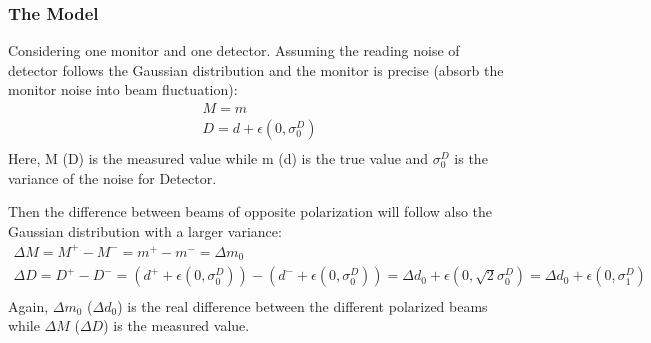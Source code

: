 \begin{comment}
For example, the famous least square fit is actually a linear regression 
$$ Y = c_0 + \sum c_i x_i + \epsilon $$
assuming Gaussian distribution of the dependent variable: $\epsilon \sim N(0, \sigma)$
Another frequenctly used scene is logistic regression for classification, which
is very similar to linear regression except f(X) will be converted into a
probability function, e.x. using the logistic function:
$$ h(z) = \frac{e^z}{1 + e^z} \quad z = f(X) $$

The assumpsion we made here is that the fluctuations in beam parameters in small, 
compared to their normal yield -- this can be verified by their yield plot. So
that we can use first order fit to model the detector's response to change in
beam parameters. Therefore the `true' asymmetry will be:
\begin{equation}
    \CA_{cor} = \CA_{raw} - \sum_i \beta_i\Delta M_i
\end{equation}
where $\CA_{cor}$ is the corrected asymmetry, $\beta_i = \frac{\partial \CA_{raw}}{\Delta M_i}$ 
is the slope and $\Delta M$ is the difference of BPM yield bewtween 
opposite helicities windows, i sums over all 5 chosen BPMs.
\end{comment}

\subsubsection{The Model}
Considering one monitor and one detector. Assuming the reading noise of detector
follows the Gaussian distribution and the monitor is precise (absorb the monitor
noise into beam fluctuation):
\begin{equation*}
    \begin{gathered}
	M = m	\\
	D = d + \epsilon(0, \sigma_0^D)    \\
    \end{gathered}
\end{equation*}
Here, M (D) is the measured value while m (d) is the true value and $\sigma_0^D$ 
is the variance of the noise for Detector.

Then the difference between beams of opposite polarization will follow also
the Gaussian distribution with a larger variance:
\begin{equation*}
    \begin{gathered}
	\Delta M = M^+ - M^- = m^+ - m^- = \Delta m_0   \\
	\Delta D = D^+ - D^- = (d^+ + \epsilon(0, \sigma_0^D)) - (d^- + \epsilon(0, \sigma_0^D))
	    = \Delta d_0 + \epsilon(0, \sqrt{2}\sigma_0^D)
	    = \Delta d_0 + \epsilon(0, \sigma_1^D) \\
    \end{gathered}
\end{equation*}
Again, $\Delta m_0$ ($\Delta d_0$) is the real difference between the
different polarized beams while $\Delta M$ ($\Delta D$) is the measured value.

